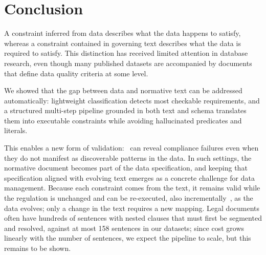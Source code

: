 \section{Conclusion}
\label{sec:conclusion}

A constraint inferred from data describes what the data happens to satisfy, whereas a constraint contained in governing text describes what the data is required to satisfy. This distinction has received limited attention in database research, even though many published datasets are accompanied by documents that define data quality criteria at some level. 

We showed that the gap between data and normative text can be addressed automatically: lightweight classification detects most checkable requirements, and a structured multi-step pipeline grounded in both text and schema translates them into executable constraints while avoiding hallucinated predicates and literals. 

This enables a new form of validation: \system\ can reveal compliance failures even when they do not manifest as discoverable patterns in the data. In such settings, the normative document becomes part of the data specification, and keeping that specification aligned with evolving text emerges as a concrete challenge for data management. Because each constraint comes from the text, it remains valid while the regulation is unchanged and can be re-executed, also incrementally~\cite{youri2024}, as the data evolves; only a change in the text requires a new mapping. Legal documents often have hundreds of sentences with nested clauses that must first be segmented and resolved, against at most 158 sentences in our datasets; since cost grows linearly with the number of sentences, we expect the pipeline to scale, but this remains to be shown.


